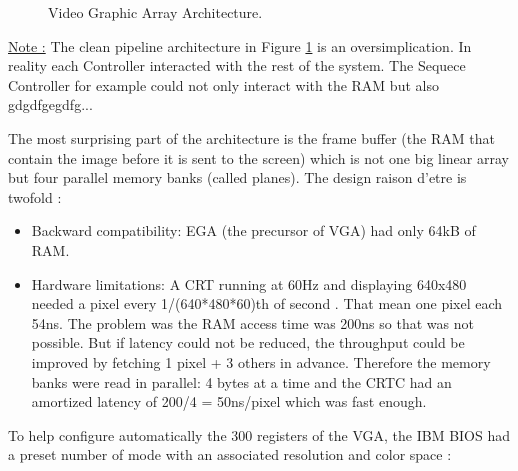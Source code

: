 \documentclass[book.tex]{subfiles}
\begin{document}
 \begin{figure}[H]
\centering
 
 \caption{Video Graphic Array Architecture.}\label{fig:vga_arch}
 \end{figure}

 {\underline{Note :}} The clean pipeline architecture in Figure \ref{fig:vga_arch} is an oversimplication. In reality each Controller interacted with the rest of the system. The Sequece Controller for example could not only interact with the RAM but also gdgdfgegdfg...



The most surprising part of the architecture is the frame buffer (the RAM that contain the image before it is sent to the screen) which is not one big linear array but four parallel memory banks (called planes). The design raison d’etre is twofold :

\begin{itemize}



\item Backward compatibility: EGA (the precursor of VGA) had only 64kB of RAM.
\item Hardware limitations: A CRT running at 60Hz and displaying 640x480 needed a pixel every 1/(640*480*60)th of second . That mean one pixel each 54ns. The problem was the RAM access time was 200ns so that was not possible. But if latency could not be reduced, the throughput could be improved by fetching 1 pixel + 3 others in advance. Therefore the memory banks were read in parallel: 4 bytes at a time and the CRTC had an amortized latency of 200/4 = 50ns/pixel which was fast enough.
\end{itemize}

\bigskip
To help configure automatically the 300 registers of the VGA, the IBM BIOS had a preset number of mode with an associated resolution and color space :
\end{document}
